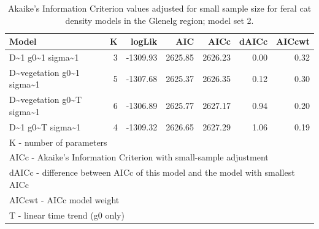 \documentclass[11pt,a4paper,titlepage,twoside,openright]{style/unimelbthesis}
\begin{document}
\begin{mainmatter}
\begingroup\fontsize{10}{12}\selectfont
\begin{longtable}[t]{lrrrrrr}
\caption{\label{tab:density-aic-g-2}Akaike's Information Criterion values adjusted for small sample size for feral cat density models in the Glenelg region; model set 2.}\\
\toprule
Model & K & logLik & AIC & AICc & dAICc & AICcwt\\
\midrule
D\textasciitilde{}1 g0\textasciitilde{}1 sigma\textasciitilde{}1 & 3 & -1309.93 & 2625.85 & 2626.23 & 0.00 & 0.32\\
D\textasciitilde{}vegetation g0\textasciitilde{}1 sigma\textasciitilde{}1 & 5 & -1307.68 & 2625.37 & 2626.35 & 0.12 & 0.30\\
D\textasciitilde{}vegetation g0\textasciitilde{}T sigma\textasciitilde{}1 & 6 & -1306.89 & 2625.77 & 2627.17 & 0.94 & 0.20\\
D\textasciitilde{}1 g0\textasciitilde{}T sigma\textasciitilde{}1 & 4 & -1309.32 & 2626.65 & 2627.29 & 1.06 & 0.19\\
\bottomrule
\multicolumn{7}{l}{\rule{0pt}{1em}K - number of parameters}\\
\multicolumn{7}{l}{\rule{0pt}{1em}AICc - Akaike's Information Criterion with small-sample adjustment}\\
\multicolumn{7}{l}{\rule{0pt}{1em}dAICc - difference between AICc of this model and the model with smallest AICc}\\
\multicolumn{7}{l}{\rule{0pt}{1em}AICcwt - AICc model weight}\\
\multicolumn{7}{l}{\rule{0pt}{1em}T - linear time trend (g0 only)}\\
\end{longtable}
\endgroup{}

\newpage

\(~\)

\(~\)

\(~\)


\end{mainmatter}
\end{document}
